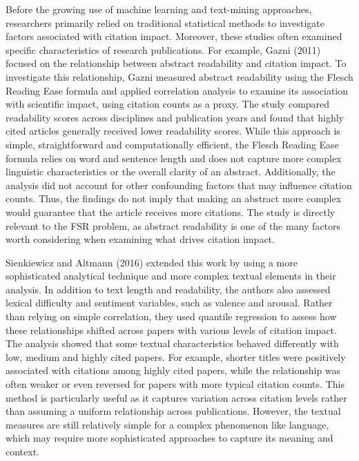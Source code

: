 \documentclass[11pt,a4paper]{article}
\begin{document}
Before the growing use of machine learning and text-mining approaches, researchers primarily relied on traditional statistical methods to investigate factors associated with citation impact. Moreover, these studies often examined specific characteristics of research publications. For example, Gazni (2011) focused on the relationship between abstract readability and citation impact. To investigate this relationship, Gazni measured abstract readability using the Flesch Reading Ease formula and applied correlation analysis to examine its association with scientific impact, using citation counts as a proxy. The study compared readability scores across disciplines and publication years and found that highly cited articles generally received lower readability scores. While this approach is simple, straightforward and computationally efficient, the Flesch Reading Ease formula relies on word and sentence length and does not capture more complex linguistic characteristics or the overall clarity of an abstract. Additionally, the analysis did not account for other confounding factors that may influence citation counts. Thus, the findings do not imply that making an abstract more complex would guarantee that the article receives more citations. The study is directly relevant to the FSR problem, as abstract readability is one of the many factors worth considering when examining what drives citation impact.

Sienkiewicz and Altmann (2016) extended this work by using a more sophisticated analytical technique and more complex textual elements in their analysis. In addition to text length and readability, the authors also assessed lexical difficulty and sentiment variables, such as valence and arousal. Rather than relying on simple correlation, they used quantile regression to assess how these relationships shifted across papers with various levels of citation impact. The analysis showed that some textual characteristics behaved differently with low, medium and highly cited papers. For example, shorter titles were positively associated with citations among highly cited papers, while the relationship was often weaker or even reversed for papers with more typical citation counts. This method is particularly useful as it captures variation across citation levels rather than assuming a uniform relationship across publications. However, the textual measures are still relatively simple for a complex phenomenon like language, which may require more sophisticated approaches to capture its meaning and context.
\end{document}
